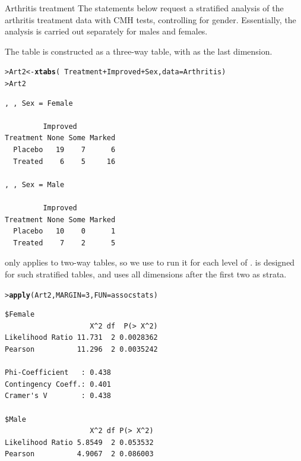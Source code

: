 \documentclass[10pt,krantz2]{krantz}\usepackage[]{graphicx}\usepackage[]{color}
\makeatletter
\newcommand{\hlnum}[1]{\textcolor[rgb]{0.686,0.059,0.569}{#1}}%
\newcommand{\hlopt}[1]{\textcolor[rgb]{0,0,0}{#1}}%
\newcommand{\hlstd}[1]{\textcolor[rgb]{0.345,0.345,0.345}{#1}}%
\newcommand{\hlkwb}[1]{\textcolor[rgb]{0.69,0.353,0.396}{#1}}%
\newcommand{\hlkwc}[1]{\textcolor[rgb]{0.333,0.667,0.333}{#1}}%
\newcommand{\hlkwd}[1]{\textcolor[rgb]{0.737,0.353,0.396}{\textbf{#1}}}%
\newenvironment{kframe}{%
 \def\at@end@of@kframe{}%
 \ifinner\ifhmode%
  \def\at@end@of@kframe{\end{minipage}}%
  \begin{minipage}{\columnwidth}%
 \fi\fi%
 \def\FrameCommand##1{\hskip\@totalleftmargin \hskip-\fboxsep
 \colorbox{shadecolor}{##1}\hskip-\fboxsep
     \hskip-\linewidth \hskip-\@totalleftmargin \hskip\columnwidth}%
 \MakeFramed {\advance\hsize-\width
   \@totalleftmargin\z@ \linewidth\hsize
   \@setminipage}}%
 {\par\unskip\endMakeFramed%
 \at@end@of@kframe}
\newenvironment{knitrout}{}{} %
\renewenvironment{knitrout}{\small\renewcommand{\baselinestretch}{.85}}{} %
\makeatother
\begin{document}
\begin{Example}[arthrit3]{Arthritis treatment}
The statements below request a stratified analysis of the arthritis
treatment data
with CMH tests,
controlling for gender.  Essentially, the analysis is carried out
separately for males and females.

The table  is constructed as a three-way table,
with  as the last dimension.
\begin{knitrout}
\color{fgcolor}\begin{kframe}
\begin{alltt}
\hlstd{> }\hlstd{Art2} \hlkwb{<-} \hlkwd{xtabs}\hlstd{(}\hlopt{~} \hlstd{Treatment} \hlopt{+} \hlstd{Improved} \hlopt{+} \hlstd{Sex,} \hlkwc{data} \hlstd{= Arthritis)}
\hlstd{> }\hlstd{Art2}
\end{alltt}
\begin{verbatim}
, , Sex = Female

         Improved
Treatment None Some Marked
  Placebo   19    7      6
  Treated    6    5     16

, , Sex = Male

         Improved
Treatment None Some Marked
  Placebo   10    0      1
  Treated    7    2      5
\end{verbatim}
\end{kframe}
\end{knitrout}
 only applies to two-way tables, so we use
 to run it for each level of .
 is designed for such stratified tables, and
uses all dimensions after the first two as strata.
\begin{knitrout}
\color{fgcolor}\begin{kframe}
\begin{alltt}
\hlstd{> }\hlkwd{apply}\hlstd{(Art2,} \hlkwc{MARGIN} \hlstd{=} \hlnum{3}\hlstd{,} \hlkwc{FUN} \hlstd{= assocstats)}
\end{alltt}
\begin{verbatim}
$Female
                    X^2 df  P(> X^2)
Likelihood Ratio 11.731  2 0.0028362
Pearson          11.296  2 0.0035242

Phi-Coefficient   : 0.438 
Contingency Coeff.: 0.401 
Cramer's V        : 0.438 

$Male
                    X^2 df P(> X^2)
Likelihood Ratio 5.8549  2 0.053532
Pearson          4.9067  2 0.086003


\end{verbatim}
\end{kframe}
\end{knitrout}
\end{Example}
\end{document}
